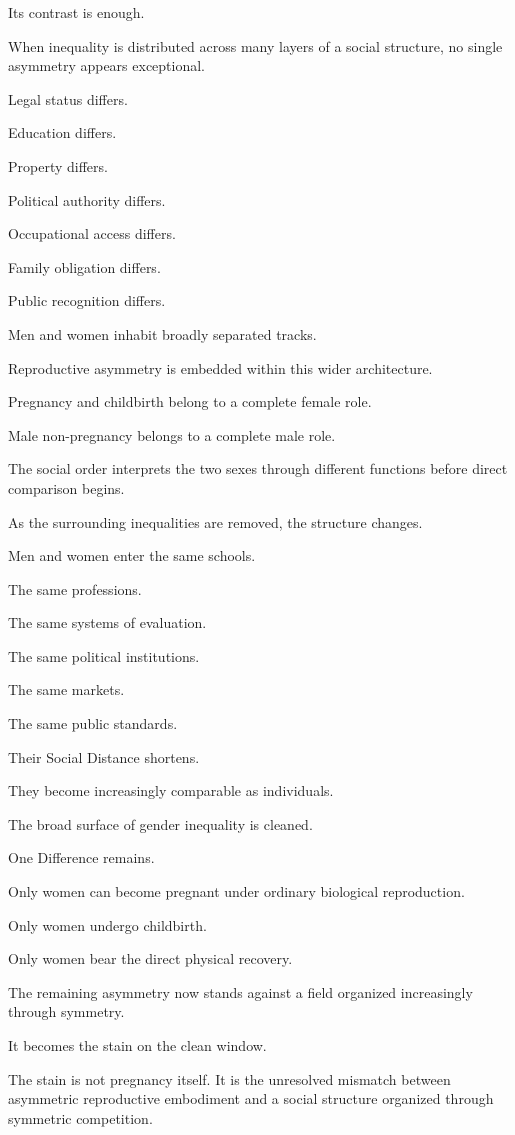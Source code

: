 Its contrast is enough.

When inequality is distributed across many layers of a social structure, no single asymmetry appears exceptional.

Legal status differs.

Education differs.

Property differs.

Political authority differs.

Occupational access differs.

Family obligation differs.

Public recognition differs.

Men and women inhabit broadly separated tracks.

Reproductive asymmetry is embedded within this wider architecture.

Pregnancy and childbirth belong to a complete female role.

Male non-pregnancy belongs to a complete male role.

The social order interprets the two sexes through different functions before direct comparison begins.

As the surrounding inequalities are removed, the structure changes.

Men and women enter the same schools.

The same professions.

The same systems of evaluation.

The same political institutions.

The same markets.

The same public standards.

Their Social Distance shortens.

They become increasingly comparable as individuals.

The broad surface of gender inequality is cleaned.

One Difference remains.

Only women can become pregnant under ordinary biological reproduction.

Only women undergo childbirth.

Only women bear the direct physical recovery.

The remaining asymmetry now stands against a field organized increasingly through symmetry.

It becomes the stain on the clean window.

The stain is not pregnancy itself. It is the unresolved mismatch between asymmetric reproductive embodiment and a social structure organized through symmetric competition.

